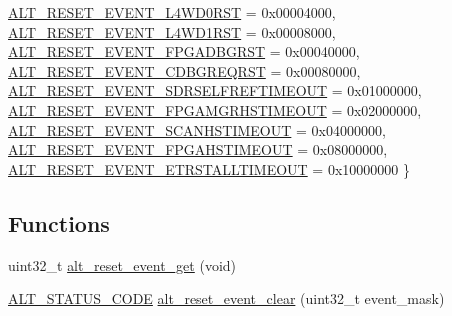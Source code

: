 \begin{DoxyCompactItemize}
\mbox{\hyperlink{group__RST__MGR__STATUS_ggaec1a3a92fb6ca1987fb805679ebae4efa7c7d31cb50bceca0ef9ffbf73eea4c54}{A\+L\+T\+\_\+\+R\+E\+S\+E\+T\+\_\+\+E\+V\+E\+N\+T\+\_\+\+L4\+W\+D0\+R\+ST}} = 0x00004000, 
\mbox{\hyperlink{group__RST__MGR__STATUS_ggaec1a3a92fb6ca1987fb805679ebae4efa07fdcb02a4d4445493b1f0f187bf7348}{A\+L\+T\+\_\+\+R\+E\+S\+E\+T\+\_\+\+E\+V\+E\+N\+T\+\_\+\+L4\+W\+D1\+R\+ST}} = 0x00008000, 
\newline
\mbox{\hyperlink{group__RST__MGR__STATUS_ggaec1a3a92fb6ca1987fb805679ebae4efa4487874f0ff7189d09031f291895023e}{A\+L\+T\+\_\+\+R\+E\+S\+E\+T\+\_\+\+E\+V\+E\+N\+T\+\_\+\+F\+P\+G\+A\+D\+B\+G\+R\+ST}} = 0x00040000, 
\mbox{\hyperlink{group__RST__MGR__STATUS_ggaec1a3a92fb6ca1987fb805679ebae4efa1710cca51f2ef653cedb71b9fe98f3b2}{A\+L\+T\+\_\+\+R\+E\+S\+E\+T\+\_\+\+E\+V\+E\+N\+T\+\_\+\+C\+D\+B\+G\+R\+E\+Q\+R\+ST}} = 0x00080000, 
\mbox{\hyperlink{group__RST__MGR__STATUS_ggaec1a3a92fb6ca1987fb805679ebae4efaa24d9e69a46a11be3ee4fb41568890e4}{A\+L\+T\+\_\+\+R\+E\+S\+E\+T\+\_\+\+E\+V\+E\+N\+T\+\_\+\+S\+D\+R\+S\+E\+L\+F\+R\+E\+F\+T\+I\+M\+E\+O\+UT}} = 0x01000000, 
\mbox{\hyperlink{group__RST__MGR__STATUS_ggaec1a3a92fb6ca1987fb805679ebae4efad858ae7fd4b6816b0f203942ed8c5d83}{A\+L\+T\+\_\+\+R\+E\+S\+E\+T\+\_\+\+E\+V\+E\+N\+T\+\_\+\+F\+P\+G\+A\+M\+G\+R\+H\+S\+T\+I\+M\+E\+O\+UT}} = 0x02000000, 
\newline
\mbox{\hyperlink{group__RST__MGR__STATUS_ggaec1a3a92fb6ca1987fb805679ebae4efaf5e8e954fa009a6c400b437774585856}{A\+L\+T\+\_\+\+R\+E\+S\+E\+T\+\_\+\+E\+V\+E\+N\+T\+\_\+\+S\+C\+A\+N\+H\+S\+T\+I\+M\+E\+O\+UT}} = 0x04000000, 
\mbox{\hyperlink{group__RST__MGR__STATUS_ggaec1a3a92fb6ca1987fb805679ebae4efa70810adcc35ca86a0496d7c32af6740a}{A\+L\+T\+\_\+\+R\+E\+S\+E\+T\+\_\+\+E\+V\+E\+N\+T\+\_\+\+F\+P\+G\+A\+H\+S\+T\+I\+M\+E\+O\+UT}} = 0x08000000, 
\mbox{\hyperlink{group__RST__MGR__STATUS_ggaec1a3a92fb6ca1987fb805679ebae4efa5dea138047b75d73ae51343a91322c75}{A\+L\+T\+\_\+\+R\+E\+S\+E\+T\+\_\+\+E\+V\+E\+N\+T\+\_\+\+E\+T\+R\+S\+T\+A\+L\+L\+T\+I\+M\+E\+O\+UT}} = 0x10000000
 \}
\end{DoxyCompactItemize}
\subsection*{Functions}
\begin{DoxyCompactItemize}
\item 
uint32\+\_\+t \mbox{\hyperlink{group__RST__MGR__STATUS_ga325735bfbb9bb88cfac8dd748c381f91}{alt\+\_\+reset\+\_\+event\+\_\+get}} (void)
\item 
\mbox{\hyperlink{hwlib_8h_abdb0d369f069723ca55d6c94bcaaaa12}{A\+L\+T\+\_\+\+S\+T\+A\+T\+U\+S\+\_\+\+C\+O\+DE}} \mbox{\hyperlink{group__RST__MGR__STATUS_ga3a92c49f229bae04593073664f56cd35}{alt\+\_\+reset\+\_\+event\+\_\+clear}} (uint32\+\_\+t event\+\_\+mask)
\end{DoxyCompactItemize}


